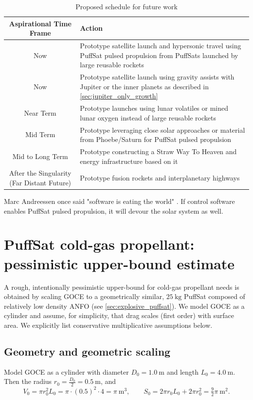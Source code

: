\documentclass{article}
\begin{document}
\begin{table}[htpb]
    \centering
    \begin{tabularx}{\textwidth}{|c|L|}\hline
        \textbf{Aspirational Time Frame} & \textbf{Action} \\\hline
        Now & Prototype satellite launch and hypersonic travel using PuffSat pulsed propulsion from PuffSats launched by large reusable rockets\\\hline
        Now & Prototype satellite launch using gravity assists with Jupiter or the inner planets as described in \autoref{sec:jupiter_only_growth} \\\hline
        Near Term & Prototype launches using lunar volatiles or mined lunar oxygen instead of large reusable rockets \\\hline
        Mid Term & Prototype leveraging close solar approaches or material from Phoebe/Saturn for PuffSat  pulsed propulsion \\\hline
        Mid to Long Term & Prototype constructing a Straw Way To Heaven and energy infrastructure based on it \\\hline
        After the Singularity (Far Distant Future) & Prototype fusion rockets and interplanetary highways \\\hline
    \end{tabularx}
    \caption{Proposed schedule for future work}
    \label{tab:schedule_future_work}
\end{table}

Marc Andreessen once said "software is eating the world" \cite{andreessen_software}.   If control software enables PuffSat pulsed propulsion, it will devour the solar system as well.

\appendix 

\section{PuffSat cold-gas propellant: pessimistic upper-bound estimate}\label{sec:estimate_cold_gas}

A rough, intentionally pessimistic upper-bound for cold-gas propellant needs is obtained by scaling GOCE to a geometrically similar, \(\SI{25}{\kg}\) PuffSat composed of relatively low density ANFO (see \autoref{sec:explosive_puffsat}).  We model GOCE as a cylinder and assume, for simplicity, that drag scales (first order) with surface area.  We explicitly list conservative multiplicative assumptions below.

\subsection*{Geometry and geometric scaling}
Model GOCE as a cylinder with diameter \(D_0=\SI{1.0}{\m}\) and length \(L_0=\SI{4.0}{\meter}\).  Then the radius \(r_0=\tfrac{D_0}{2}=\SI{0.5}{\meter}\), and
\[
V_0 = \pi r_0^2 L_0 = \pi\cdot(0.5)^2\cdot 4 = \pi\ \mathrm{m^3},
\qquad
S_0 = 2\pi r_0 L_0 + 2\pi r_0^2 = \tfrac{9}{2}\pi\ \mathrm{m^2}.
\]
\end{document}
